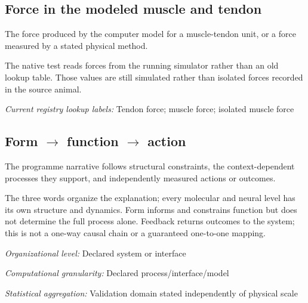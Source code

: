 \begin{samepage}
\subsection*{Force in the modeled muscle and tendon}
\noindent The force produced by the computer model for a muscle-tendon unit, or a force measured by a stated physical method.\par
\end{samepage}
\begin{samepage}
\noindent The native test reads forces from the running simulator rather than an old lookup table. Those values are still simulated rather than isolated forces recorded in the source animal.\par\nopagebreak[4]

\end{samepage}


\noindent\textit{Current registry lookup labels:} Tendon force; muscle force; isolated muscle force\par

\begin{samepage}
\subsection*{Form \(\rightarrow\) function \(\rightarrow\) action}
\noindent The programme narrative follows structural constraints, the context-dependent processes they support, and independently measured actions or outcomes.\par
\end{samepage}
\noindent The three words organize the explanation; every molecular and neural level has its own structure and dynamics. Form informs and constrains function but does not determine the full process alone. Feedback returns outcomes to the system; this is not a one-way causal chain or a guaranteed one-to-one mapping.\par
\noindent\textit{Organizational level:} Declared system or interface\par
\noindent\textit{Computational granularity:} Declared process/interface/model\par
\begin{samepage}
\noindent\textit{Statistical aggregation:} Validation domain stated independently of physical scale\par\nopagebreak[4]

\end{samepage}


